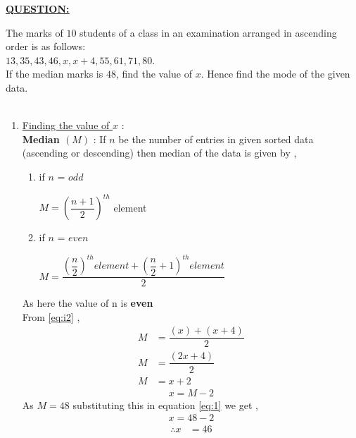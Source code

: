 \documentclass[journal,12pt,twocolumn]{IEEEtran}
\begin{document}
\begin{flushleft}
	\begin{large}
		\underline{\underline{\textbf{QUESTION:}}} \\[8pt]
	\end{large}
The marks of $10$ students of a class in an examination arranged in ascending order
is as follows:\\
$13, 35, 43, 46, x, x+4, 55, 61, 71, 80$.\\
If the median marks is $48$, find the value of $x$. Hence find the mode of the given
data.\\[9pt]
\solution \\[8pt]
\begin{enumerate}
\item \underline{Finding the value of $x$} :\\[8pt]
\textbf{Median $(M)$} : If $n$ be the number of entries in given sorted data (ascending or descending) then median of the data is given by ,\\

	\begin{enumerate}[label=(\roman*)]
		\item if $n$ = $odd$ 
		\begin{center}
		    $ M= \left(\dfrac{n+1}{2}\right)^{th}$ element
		\end{center}
		\item if $n$ = $even$\\[6pt]
		\begin{center}
		    $ M= \dfrac{{\left(\dfrac{n}{2}\right)}^{th}element+\left(\dfrac{n}{2}+1\right)^{th}element}{2}$ \\[10pt]
		\end{center} 
		\label{eq:i2}	
	\end{enumerate}
As here the value of n is \textbf{even}\\
	From \eqref{eq:i2} ,
	\begin{align*}
		 M &= \dfrac{(x)+(x+4)}{2}\\
	 	 M &= \dfrac{(2x+4)}{2}\\
		 M &= x+2
	\end{align*}	
	\begin{align}
	\label{eq:1}	 
	 x = M-2
	\end{align}
As $M=48$ substituting this in equation \eqref{eq:1} we get ,
   \begin{align*}
		 x = 48-2
	\end{align*}
%
	\begin{align}
		\therefore x &=46
	\end{align}
	

\end{enumerate}
\end{flushleft}
\end{document}
